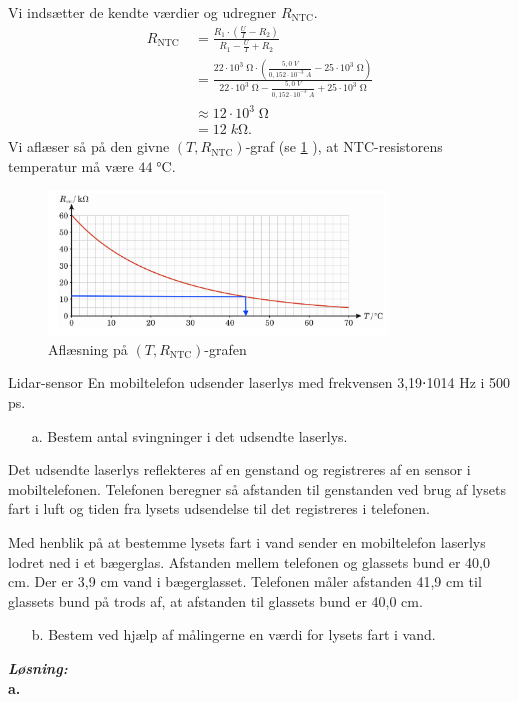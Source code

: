 \documentclass{report}
\newcommand{\sol}{\setlength{\parindent}{0cm}\textbf{\textit{Løsning:}}\setlength{\parindent}{1cm}}
\begin{document}
Vi indsætter de kendte værdier og udregner $R _{\text{NTC} }$.
\begin{equation*}
\begin{split}
  R _{\text{NTC } }&=\frac{R_1 \cdot \left(\frac{U}{I}-R_2\right) }{R_1-\frac{U}{I}+R_2}\\
  &=\frac{22 \cdot 10^3\;\unit{\ohm} \cdot \left(\frac{5,0 \;\unit{V} }{0,152 \cdot 10 ^{-3}\;\unit{A} }-25 \cdot 10^3 \;\unit{\ohm} \right) }{22 \cdot 10^3 \;\unit{\ohm} - \frac{5,0 \;\unit{V} }{0,152 \cdot 10 ^{-3} \;\unit{A} }+25 \cdot 10^3 \;\unit{\ohm}}\\
  &\approx 12 \cdot 10^3 \;\unit{\ohm} \\
  &=12 \;\unit{k\ohm}.
\end{split}
\end{equation*}
Vi aflæser så på den givne $(T, R _{\text{NTC} })$-graf (se \cref{fig:TR} ), at NTC-resistorens temperatur må være $44 \;\unit{\celsius} $.
\begin{figure}[H]
\begin{center}
  \includegraphics[width=0.8\textwidth]{TR.png}
\end{center}
\caption{Aflæsning på $(T, R _{\text{NTC} })$-grafen}
\label{fig:TR}
\end{figure}

\begin{question}{Lidar-sensor}{}
  En mobiltelefon udsender laserlys med frekvensen 3,19⋅1014 Hz i 500 ps.
\begin{itemize}
  \item[a.] Bestem antal svingninger i det udsendte laserlys.
\end{itemize}
Det udsendte laserlys reflekteres af en genstand og registreres af en sensor i mobiltelefonen. Telefonen beregner så afstanden til genstanden ved brug af lysets fart i luft og tiden fra lysets udsendelse til det registreres i telefonen.

Med henblik på at bestemme lysets fart i vand sender en mobiltelefon laserlys lodret ned i et bægerglas. Afstanden mellem telefonen og glassets bund er 40,0 cm. Der er 3,9 cm vand i bægerglasset. Telefonen måler afstanden 41,9 cm til glassets bund på trods af, at afstanden til glassets bund er 40,0 cm.
\begin{itemize}
  \item[b.] Bestem ved hjælp af målingerne en værdi for lysets fart i vand.
\end{itemize}
\end{question}
\sol \\
\textbf{a.}
\end{document}
